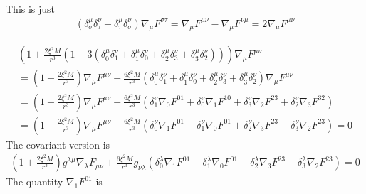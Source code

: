 \documentclass[12pt]{article}
\def\nn{\nonumber}
\begin{document}
This is just
\begin{gather}
(\delta^{\mu}_{\sigma} \delta^{\nu}_{\tau} - \delta^{\mu}_{\tau} \delta^{\nu}_{\sigma})
\nabla_{\mu}
F^{\sigma \tau}
=
\nabla_{\mu}
F^{\mu \nu}
-
\nabla_{\mu}
F^{\nu \mu}
=
2
\nabla_{\mu}
F^{\mu \nu}
\end{gather}

\begin{gather}
(1 + \frac{2 \xi^{2} M}{r^{3}} (1 - 3 (\delta^{\mu}_{0}\delta^{\nu}_{1} + \delta^{\mu}_{1}\delta^{\nu}_{0} + \delta^{\mu}_{2}\delta^{\nu}_{3} + \delta^{\mu}_{3}\delta^{\nu}_{2})))
\nabla_{\mu}F^{\mu\nu}
\nn \\
=
(1 + \frac{2 \xi^{2} M}{r^{3}} )
\nabla_{\mu}F^{\mu\nu}
-
\frac{6 \xi^{2} M}{r^{3}} (\delta^{\mu}_{0}\delta^{\nu}_{1} + \delta^{\mu}_{1}\delta^{\nu}_{0} + \delta^{\mu}_{2}\delta^{\nu}_{3} + \delta^{\mu}_{3}\delta^{\nu}_{2})
\nabla_{\mu}F^{\mu\nu}
\nn \\
=
(1 + \frac{2 \xi^{2} M}{r^{3}} )
\nabla_{\mu}F^{\mu\nu}
-
\frac{6 \xi^{2} M}{r^{3}} 
(
\delta_{1}^{\nu}
\nabla_{0}F^{0 1}
+ 
\delta_{0}^{\nu}
\nabla_{1}F^{1 0}
+ 
\delta_{3}^{\nu}
\nabla_{2}F^{2 3}
+ 
\delta_{2}^{\nu}
\nabla_{3}F^{3 2})
\nn \\
=
(1 + \frac{2 \xi^{2} M}{r^{3}} )
\nabla_{\mu}F^{\mu\nu}
+
\frac{6 \xi^{2} M}{r^{3}} 
(
\delta_{0}^{\nu}
\nabla_{1}F^{0 1}
-
\delta_{1}^{\nu}
\nabla_{0}F^{0 1}
+
\delta_{2}^{\nu}
\nabla_{3}F^{2 3}
- 
\delta_{3}^{\nu}
\nabla_{2}F^{2 3}
)
=0
\end{gather}
The covariant version is
\begin{gather}
(1 + \frac{2 \xi^{2} M}{r^{3}} )
g^{\lambda \mu}
\nabla_{\lambda}F_{\mu \nu}
+
\frac{6 \xi^{2} M}{r^{3}} 
g_{\nu \lambda}
(
\delta_{0}^{\lambda}
\nabla_{1}F^{0 1}
-
\delta_{1}^{\lambda}
\nabla_{0}F^{0 1}
+
\delta_{2}^{\lambda}
\nabla_{3}F^{2 3}
- 
\delta_{3}^{\lambda}
\nabla_{2}F^{2 3}
)
=0
\end{gather}
The quantity $\nabla_{1} F^{01}$ is
\end{document}
